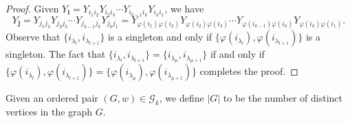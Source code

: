 \begin{proof}
  Given $Y_\mathbf{i} = Y_{i_1 i_2}Y_{i_2 i_3} \cdots Y_{i_{k-1} i_k}Y_{i_k i_1}$, we have
  \[
  Y_{\mathbf{j}} = Y_{j_1 j_2}Y_{j_2 j_3} \cdots Y_{j_{k-1} j_k}Y_{j_k j_1} 
  = Y_{\varphi(i_1) \varphi(i_2)}Y_{\varphi(i_2) \varphi(i_3)} \cdots Y_{\varphi(i_{k-1}) \varphi(i_k)}Y_{\varphi(i_k) \varphi(i_1)}.
  \] 
  Observe that $\{ i_{\lambda_l},i_{\lambda_{l+1}} \}$ is a singleton and only if $\{ \varphi(i_{\lambda_l}),\varphi(i_{\lambda_{l+1}}) \}$ is a singleton.
  The fact that $\{ i_{\lambda_l},i_{\lambda_{l+1}} \} = \{ i_{\lambda_\mu},i_{\lambda_{\mu+1}} \}$ if and only if $\{ \varphi(i_{\lambda_l}),\varphi(i_{\lambda_{l+1}}) \} = \{ \varphi(i_{\lambda_\mu}),\varphi(i_{\lambda_{\mu+1}}) \}$ completes the proof.

\end{proof}
\begin{definition}
  \label{def:abs.G}
  Given an ordered pair $(G,w) \in \mathcal{G}_k$, we define $|G|$ to be the number of distinct vertices in the graph $G$.
\end{definition}

